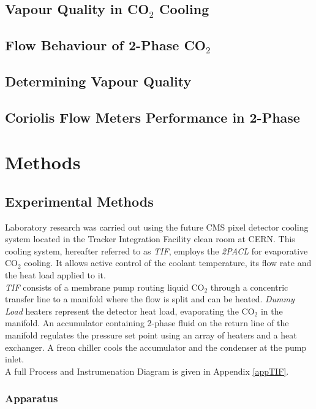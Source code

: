 \documentclass{report}
\begin{document}
\section{Vapour Quality in CO$_2$ Cooling}
\section{Flow Behaviour of 2-Phase CO$_2$}
\section{Determining Vapour Quality}
\section{Coriolis Flow Meters Performance in 2-Phase}

\chapter{Methods}
\section{Experimental Methods}
Laboratory research was carried out using the future CMS pixel detector cooling system located in the Tracker Integration Facility clean room at CERN. This cooling system, hereafter referred to as \textit{TIF}, employs the \textit{2PACL} for evaporative CO$_2$ cooling. It allows active control of the coolant temperature, its flow rate and the heat load applied to  it. \\
\textit{TIF} consists of a membrane pump routing liquid CO$_2$ through a concentric transfer line to a manifold where the flow is split and can be heated. \textit{Dummy Load} heaters represent the detector heat load, evaporating the CO$_2$ in the manifold. An accumulator containing 2-phase fluid on the return line of the manifold regulates the pressure set point using an array of heaters and a heat exchanger. A freon chiller cools the accumulator and the condenser at the pump inlet.\\
A full Process and Instrumenation Diagram is given in Appendix \ref{appTIF}.
\subsection{Apparatus}
\end{document}
